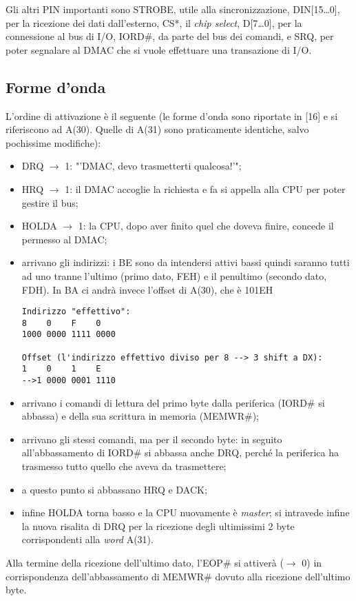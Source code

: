 Gli altri PIN importanti sono STROBE, utile alla sincronizzazione, DIN[15\ldots 0], per la ricezione dei dati dall'esterno, CS*, il \textit{chip select}, D[7\ldots 0], per la connessione al bus di I/O, IORD\#, da parte del bus dei comandi, e SRQ, per poter segnalare al DMAC che si vuole effettuare una transazione di I/O.


\subsection{Forme d'onda}
L'ordine di attivazione è il seguente (le forme d'onda sono riportate in [16] e si riferiscono ad A(30). Quelle di A(31) sono praticamente identiche, salvo pochissime modifiche):
\begin{itemize}
\item DRQ $\to$ 1: "'DMAC, devo trasmetterti qualcosa!'";
\item HRQ $\to$ 1: il DMAC accoglie la richiesta e fa si appella alla CPU per poter gestire il bus;
\item HOLDA $\to$ 1: la CPU, dopo aver finito quel che doveva finire, concede il permesso al DMAC;
\item arrivano gli indirizzi: i BE sono da intendersi attivi bassi quindi saranno tutti ad uno tranne l'ultimo (primo dato, FEH) e il penultimo (secondo dato, FDH). In BA ci andrà invece l'offset di A(30), che è 101EH
\begin{verbatim}
Indirizzo "effettivo":
8    0    F    0
1000 0000 1111 0000

Offset (l'indirizzo effettivo diviso per 8 --> 3 shift a DX):
1    0    1    E
-->1 0000 0001 1110 
\end{verbatim}
\item arrivano i comandi di lettura del primo byte dalla periferica (IORD\# si abbassa) e della sua scrittura in memoria (MEMWR\#);
\item arrivano gli stessi comandi, ma per il secondo byte: in seguito all'abbassamento di IORD\# si abbassa anche DRQ, perché la periferica ha trasmesso tutto quello che aveva da trasmettere;
\item a questo punto si abbassano HRQ e DACK;
\item infine HOLDA torna basso e la CPU nuovamente è \textit{master}; si intravede infine la nuova risalita di DRQ per la ricezione degli ultimissimi 2 byte corrispondenti alla \textit{word} A(31).
\end{itemize}
Alla termine della ricezione dell'ultimo dato, l'EOP\# si attiverà ($\to$ 0) in corrispondenza dell'abbassamento di MEMWR\# dovuto alla ricezione dell'ultimo byte.

